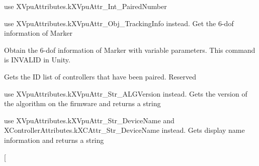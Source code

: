 \begin{DoxyRefList}
use X\+Vpu\+Attributes.\+k\+X\+Vpu\+Attr\+\_\+\+Int\+\_\+\+Paired\+Number  
\item[\label{deprecated__deprecated000035}%
\Hypertarget{deprecated__deprecated000035}%
Member \mbox{\hyperlink{class_ximmerse_1_1_input_system_1_1_x_device_plugin_ab7f817a86e5b3af956089fb089b7d0c3ab6dd9ac1d2e47d2cc527acc21b0e35a8}{Ximmerse.Input\+System.X\+Device\+Plugin.k\+X\+Act\+\_\+\+Get\+Marker\+Info}} ]use X\+Vpu\+Attributes.\+k\+X\+Vpu\+Attr\+\_\+\+Obj\+\_\+\+Tracking\+Info instead. Get the 6-\/dof information of Marker  
\item[\label{deprecated__deprecated000036}%
\Hypertarget{deprecated__deprecated000036}%
Member \mbox{\hyperlink{class_ximmerse_1_1_input_system_1_1_x_device_plugin_ab7f817a86e5b3af956089fb089b7d0c3a6e330e368787658e85be837395d488d2}{Ximmerse.Input\+System.X\+Device\+Plugin.k\+X\+Act\+\_\+\+Get\+Marker\+Info\+\_\+V}} ]Obtain the 6-\/dof information of Marker with variable parameters. This command is I\+N\+V\+A\+L\+ID in Unity.  
\item[\label{deprecated__deprecated000033}%
\Hypertarget{deprecated__deprecated000033}%
Member \mbox{\hyperlink{class_ximmerse_1_1_input_system_1_1_x_device_plugin_ab7f817a86e5b3af956089fb089b7d0c3ae966e0f26e4ea0a4a6b6b9989616a2ca}{Ximmerse.Input\+System.X\+Device\+Plugin.k\+X\+Act\+\_\+\+Get\+Paired\+List}} ]Gets the ID list of controllers that have been paired. Reserved  
\item[\label{deprecated__deprecated000021}%
\Hypertarget{deprecated__deprecated000021}%
Member \mbox{\hyperlink{class_ximmerse_1_1_input_system_1_1_x_device_plugin_ab7f817a86e5b3af956089fb089b7d0c3aa1329f1a1694b4a9d3965592fd41bfba}{Ximmerse.Input\+System.X\+Device\+Plugin.k\+X\+Act\+\_\+\+Get\+Str\+\_\+\+A\+L\+G\+Version}} ]use X\+Vpu\+Attributes.\+k\+X\+Vpu\+Attr\+\_\+\+Str\+\_\+\+A\+L\+G\+Version instead. Gets the version of the algorithm on the firmware and returns a string  
\item[\label{deprecated__deprecated000020}%
\Hypertarget{deprecated__deprecated000020}%
Member \mbox{\hyperlink{class_ximmerse_1_1_input_system_1_1_x_device_plugin_ab7f817a86e5b3af956089fb089b7d0c3ae799224e5ca05b1b2ed58e459e22d4b5}{Ximmerse.Input\+System.X\+Device\+Plugin.k\+X\+Act\+\_\+\+Get\+Str\+\_\+\+Display\+Name}} ]use X\+Vpu\+Attributes.\+k\+X\+Vpu\+Attr\+\_\+\+Str\+\_\+\+Device\+Name and X\+Controller\+Attributes.\+k\+X\+C\+Attr\+\_\+\+Str\+\_\+\+Device\+Name instead. Gets display name information and returns a string  
\item[\label{deprecated__deprecated000024}%

\end{DoxyRefList}
